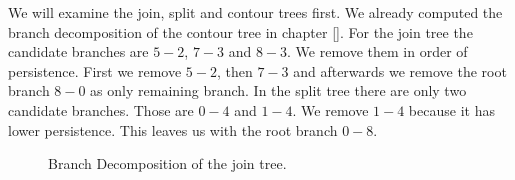 We will examine the join, split and contour trees first. We already computed the branch decomposition of the contour tree in chapter []. For the join tree the candidate branches are $5-2$, $7-3$ and $8-3$. We remove them in order of persistence. First we remove $5-2$, then $7-3$ and afterwards we remove the root branch $8-0$ as only remaining branch. In the split tree there are only two candidate branches. Those are $0-4$ and $1-4$. We remove $1-4$ because it has lower persistence. This leaves us with the root branch $0-8$.

\begin{figure}[]%
    \centering
    \caption{Branch Decomposition of the join tree.}%
    \label{fig:join-tree-decomp}%
\end{figure}

